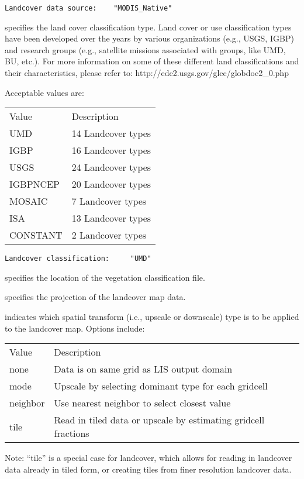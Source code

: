  \begin{Verbatim}[frame=single]
Landcover data source:    "MODIS_Native"
 \end{Verbatim}

 
  specifies the land cover 
 classification type.  Land cover or use classification types
 have been developed over the years by various organizations
 (e.g., USGS, IGBP) and research groups (e.g., satellite missions 
 associated with groups, like UMD, BU, etc.).
 For more information on some of these different land classifications
 and their characteristics, please refer to:
  http://edc2.usgs.gov/glcc/globdoc2\_0.php

 Acceptable values are:

 \begin{tabular}{ll}
 Value     & Description               \\
 UMD       &  14 Landcover types       \\
 IGBP      &  16 Landcover types       \\
 USGS      &  24 Landcover types       \\
 IGBPNCEP  &  20 Landcover types       \\
 MOSAIC    &   7 Landcover types       \\
 ISA       &  13 Landcover types       \\
 CONSTANT  &   2 Landcover types       \\
 \end{tabular}
 

 \begin{Verbatim}[frame=single]
Landcover classification:     "UMD"  
 \end{Verbatim}

 
  specifies the location of the vegetation
 classification file.

  specifies the projection of the
 landcover map data.

  indicates which spatial transform
 (i.e., upscale or downscale) type is to be applied to the landcover
 map.  Options include:

 \begin{tabular}{ll}
 Value & Description                                          \\
 none  & Data is on same grid as LIS output domain            \\
 mode  & Upscale by selecting dominant type for each gridcell \\
 neighbor &  Use nearest neighbor to select closest value  \\
 tile  & Read in tiled data or upscale by estimating gridcell fractions\\
 \end{tabular}
 Note: ``tile'' is a special case for landcover, which allows
 for reading in landcover data already in tiled form, or creating
 tiles from finer resolution landcover data.
 

